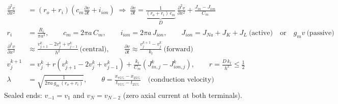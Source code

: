 \documentclass[border=14pt,varwidth=18cm]{standalone}
\begin{document}
\begin{align}
\frac{\partial^{2} v}{\partial x^{2}} &= (r_o+r_i)\left(c_m\frac{\partial v}{\partial t}+i_{ion}\right)
\;\Longrightarrow\;
\frac{\partial v}{\partial t} = \underbrace{\frac{1}{(r_o+r_i)\,c_m}}_{D}\,\frac{\partial^{2} v}{\partial x^{2}}
+\frac{J_{in}-J_{ion}}{C_m} \\
r_i &= \frac{R_i}{\pi a^{2}},\qquad c_m = 2\pi a\,C_m,\qquad i_{ion}=2\pi a\,J_{ion},\qquad
J_{ion} = J_{Na}+J_K+J_L\ \text{(active)}\quad\text{or}\quad g_m v\ \text{(passive)} \\
\frac{\partial^{2} v}{\partial x^{2}} &\approx \frac{v_{j+1}^{k}-2v_{j}^{k}+v_{j-1}^{k}}{h^{2}}
\ \text{(central)},\qquad
\frac{\partial v}{\partial t} \approx \frac{v_{j}^{k+1}-v_{j}^{k}}{k_t}\ \text{(forward)} \\
v_{j}^{k+1} &= v_{j}^{k} + r\left(v_{j+1}^{k}-2v_{j}^{k}+v_{j-1}^{k}\right)
+\frac{k_t}{C_m}\left(J_{in,j}^{k}-J_{ion,j}^{k}\right),\qquad r=\frac{D\,k_t}{h^{2}}\le\frac{1}{2} \\
\lambda &= \sqrt{\frac{1}{2\pi a\,g_m\,(r_o+r_i)}},\qquad
\theta = \frac{x_{75\%}-x_{25\%}}{t_{75\%}-t_{25\%}}\quad\text{(conduction velocity)}
\end{align}
Sealed ends: $v_{-1}=v_{1}$ and $v_{N}=v_{N-2}$ (zero axial current at both terminals).
\end{document}
